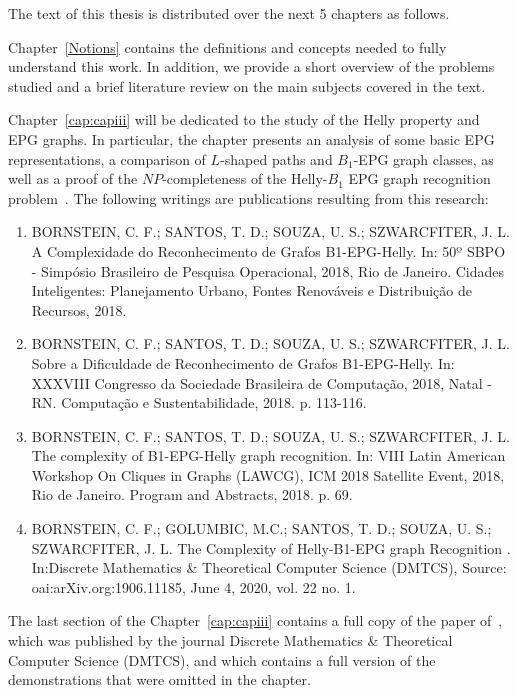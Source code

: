 The text of this thesis is distributed over the next 5 chapters as follows.


Chapter~\ref{Notions} contains the definitions and concepts needed to fully understand this work.  In addition, we provide a short overview of the problems studied and a brief literature review on the main subjects covered in the text.

Chapter~\ref{cap:capiii} will be dedicated to the study of the Helly property and EPG graphs. In particular, the chapter presents an analysis of some basic EPG representations, a comparison of $L$-shaped paths and $B_1$-EPG graph classes, as well as a proof of the $NP$-completeness of the Helly-$B_1$ EPG  graph recognition problem~\cite{dmtcs:6506}. The following writings are publications resulting from this research:

\begin{enumerate}
    \item BORNSTEIN, C. F.; SANTOS, T. D.; SOUZA, U. S.; SZWARCFITER, J. L. A Complexidade do Reconhecimento de Grafos B1-EPG-Helly. In: 50º SBPO - Simpósio Brasileiro de Pesquisa Operacional, 2018, Rio de Janeiro. Cidades Inteligentes: Planejamento Urbano, Fontes Renováveis e Distribuição de Recursos, 2018.

     \item BORNSTEIN, C. F.; SANTOS, T. D.; SOUZA, U. S.; SZWARCFITER, J. L. Sobre a Dificuldade de Reconhecimento de Grafos B1-EPG-Helly. In: XXXVIII Congresso da Sociedade Brasileira de Computação, 2018, Natal - RN. Computação e Sustentabilidade, 2018. p. 113-116.

     
     \item BORNSTEIN, C. F.; SANTOS, T. D.; SOUZA, U. S.; SZWARCFITER, J. L. The complexity of B1-EPG-Helly graph recognition. In: VIII Latin American Workshop On Cliques in Graphs (LAWCG), ICM 2018 Satellite Event, 2018, Rio de Janeiro. Program and Abstracts, 2018. p. 69.

     
     \item BORNSTEIN, C. F.; GOLUMBIC, M.C.; SANTOS, T. D.; SOUZA, U. S.; SZWARCFITER, J. L.  The Complexity of Helly-B1-EPG graph Recognition . In:Discrete Mathematics \& Theoretical Computer Science (DMTCS), Source: oai:arXiv.org:1906.11185, June 4, 2020,  vol. 22 no. 1. 
\end{enumerate}

The last section of the Chapter~\ref{cap:capiii} contains a full copy of the paper of~\citet{dmtcs:6506}, which was published by the journal Discrete Mathematics \& Theoretical Computer Science (DMTCS), and which contains a full version of the demonstrations that were omitted in the chapter.


